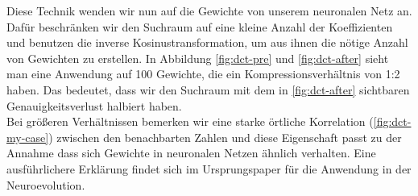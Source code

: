             Diese Technik wenden wir nun auf die Gewichte von unserem neuronalen Netz an. Dafür beschränken wir den Suchraum auf eine kleine Anzahl der Koeffizienten und benutzen die inverse Kosinustransformation, um aus ihnen die nötige Anzahl von Gewichten zu erstellen. In Abbildung \ref{fig:dct-pre} und \ref{fig:dct-after} sieht man eine Anwendung auf 100 Gewichte, die ein Kompressionsverhältnis von 1:2 haben. Das bedeutet, dass wir den Suchraum mit dem in \ref{fig:dct-after} sichtbaren Genauigkeitsverlust halbiert haben.\\

            \noindent
            Bei größeren Verhältnissen bemerken wir eine starke örtliche Korrelation (\ref{fig:dct-my-case}) zwischen den benachbarten Zahlen und diese Eigenschaft passt zu der Annahme dass sich Gewichte in neuronalen Netzen ähnlich verhalten. Eine ausführlichere Erklärung findet sich im Ursprungspaper für die Anwendung in der Neuroevolution.\cite{cosyne1}
